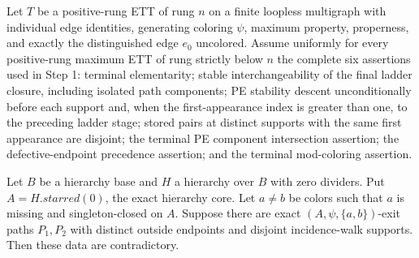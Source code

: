 \begin{lemma}
Let $T$ be a positive-rung ETT of rung $n$ on a finite loopless
multigraph with individual edge identities, generating coloring $\psi$,
maximum property, properness, and exactly the distinguished edge $e_0$
uncolored.  Assume uniformly for every positive-rung maximum ETT of rung
strictly below $n$ the complete six assertions used in Step 1:
terminal elementarity; stable interchangeability of the final ladder
closure, including isolated path components; PE stability descent unconditionally before each support and, when the
first-appearance index is greater than one, to the preceding ladder stage;
stored pairs at distinct supports with the same first appearance are disjoint; the terminal PE component intersection assertion; the
defective-endpoint precedence assertion; and the terminal mod-coloring
assertion.

Let $B$ be a hierarchy base and $H$ a hierarchy over $B$ with zero
dividers.  Put $A=H.\mathit{starred}(0)$, the exact hierarchy core.  Let
$a\ne b$ be colors such that $a$ is missing and singleton-closed on $A$.
Suppose there are exact $(A,\psi,\{a,b\})$-exit paths $P_1,P_2$ with
distinct outside endpoints and disjoint incidence-walk supports.  Then
these data are contradictory.
\end{lemma}
